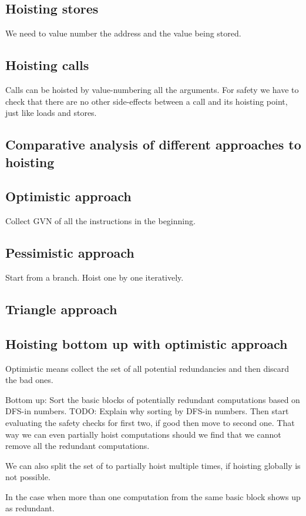 \begin{section}
\section{Hoisting stores}
We need to value number the address and the value being stored.

\section{Hoisting calls}
Calls can be hoisted by value-numbering all the arguments. For safety
we have to check that there are no other side-effects between a call and
its hoisting point, just like loads and stores.


\section{Comparative analysis of different approaches to hoisting}
\subsection{Optimistic approach}
Collect GVN of all the instructions in the beginning.
\subsection{Pessimistic approach}
Start from a branch. Hoist one by one iteratively.
\subsection{Triangle approach}

\section{Hoisting bottom up with optimistic approach}
Optimistic means collect the set of all potential redundancies and
then discard the bad ones.

Bottom up: Sort the basic blocks of potentially redundant computations
based on DFS-in numbers.  TODO: Explain why sorting by DFS-in numbers.
Then start evaluating the safety checks for first two, if good then
move to second one. That way we can even partially hoist computations
should we find that we cannot remove all the redundant computations.

We can also split the set of to partially hoist multiple times, if
hoisting globally is not possible.

In the case when more than one computation from the same basic block
shows up as redundant.


\end{section}
